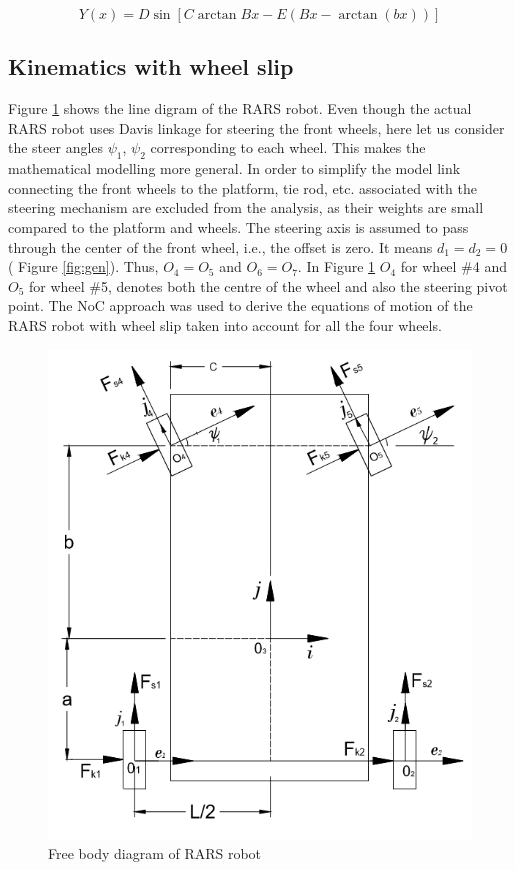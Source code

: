  \begin{equation}\label{eqn:magic}
 Y(x)=D\sin[C \arctan{Bx -E(Bx-\arctan(bx))}]
 \end{equation}

\subsection{Kinematics with wheel slip}
\label{sec:slipKina}
 Figure \ref{fig:VehicleWithSlip}  shows the line digram of the RARS robot. Even though the actual RARS robot uses Davis linkage for steering the front wheels, here let us consider the steer angles $\psi_1$, $\psi_2$ corresponding to  each wheel. This makes the mathematical  modelling  more general. In order to simplify the model  link connecting the front wheels to the platform, tie rod, etc. associated with the steering mechanism   are excluded from the analysis, as their weights are small compared to the platform and wheels. The steering axis is assumed to pass through the center of the front wheel, i.e.,  the offset is zero.  It means $d_1=d_2=0$  ( Figure \ref{fig:gen}). Thus, $O_4=O_5$ and $O_6=O_7$. In Figure \ref{fig:VehicleWithSlip}  $O_4$  for wheel \#4 and $O_5$ for wheel \#5, denotes both the centre of the wheel and also the steering pivot point. The NoC approach was used to derive the equations of motion of the RARS robot with wheel slip taken into account for all the four wheels.
\begin{figure}
	\centering
	\includegraphics[width=\linewidth]{Chapter4/fig/VechileWithSlip}
	\caption{Free body diagram of RARS robot}
	\label{fig:VehicleWithSlip}
\end{figure}
